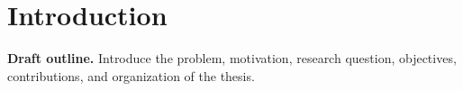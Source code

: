 \chapter{Introduction}
\label{chap:introduction}

\textbf{Draft outline.} Introduce the problem, motivation, research question,
objectives, contributions, and organization of the thesis.




%
